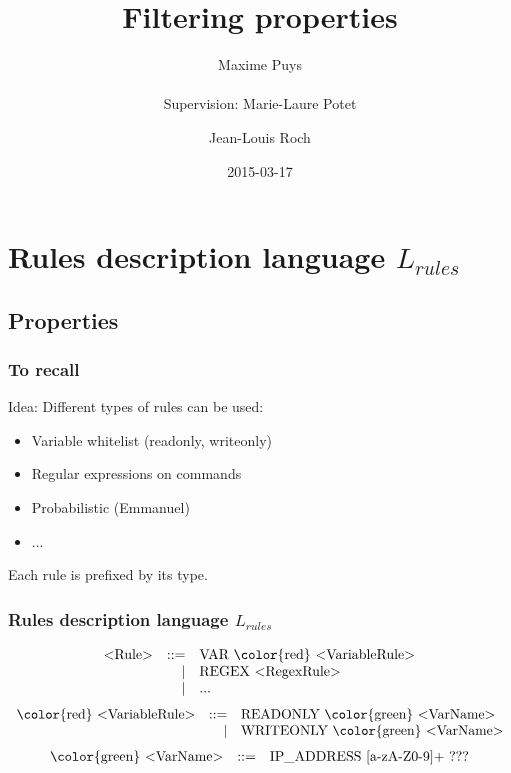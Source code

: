 \documentclass{beamer}
\title{Filtering properties}
\author[Maxime Puys]{Maxime Puys\\~\\Supervision: Marie-Laure Potet \and Jean-Louis Roch}
\date{2015-03-17}
\begin{document}
\begin{frame}
    \maketitle
\end{frame}

\section{Rules description language $L_{rules}$}
\subsection{Properties}

\begin{frame}
    \tableofcontents
\end{frame}

\begin{frame}
    \frametitle{To recall}

    Idea: Different types of rules can be used:
    \vfill
    \begin{itemize}
        \item Variable whitelist (readonly, writeonly)
            \vfill
        \item Regular expressions on commands
            \vfill
        \item Probabilistic (Emmanuel)
            \vfill
        \item ...
    \end{itemize}
    \vfill
    Each rule is prefixed by its type.
\end{frame}

\begin{frame}
    \frametitle{Rules description language $L_{rules}$}

    \[
        \begin{array}{l r l}
            \text{<Rule>} & ::= & \text{VAR {\color{red} <VariableRule>}} \\
                          &   | & \text{REGEX <RegexRule>} \\
                          &   | & \text{...} \\
        \end{array}
    \]
    \pause
    \vfill
    \[
        \begin{array}{l r l}
            \text{{\color{red} <VariableRule>}} & ::= & \text{READONLY {\color{green} <VarName>}} \\
                                                &   | & \text{WRITEONLY {\color{green} <VarName>}} \\
        \end{array}
    \]
    \vfill
    \[
        \begin{array}{l r l}
            \text{{\color{green} <VarName>}} & ::= & \text{IP\_ADDRESS [a-zA-Z0-9]+ ???} \\
        \end{array}
    \]
\end{frame}
\end{document}
